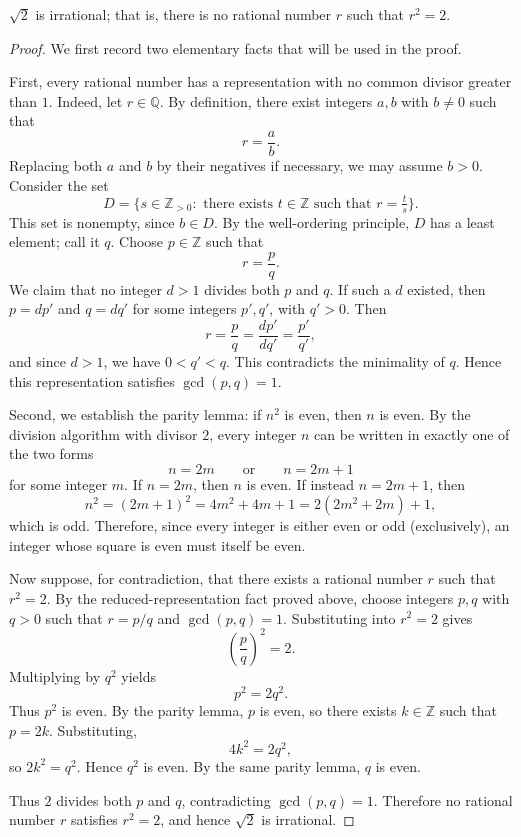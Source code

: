 \begin{theorem}
$\sqrt{2}$ is irrational; that is, there is no rational number $r$ such that $r^2=2$.
\end{theorem}

\begin{proof}
We first record two elementary facts that will be used in the proof.

First, every rational number has a representation with no common divisor greater than $1$. Indeed, let $r\in\mathbb{Q}$. By definition, there exist integers $a,b$ with $b\neq 0$ such that
\[
r=\frac{a}{b}.
\]
Replacing both $a$ and $b$ by their negatives if necessary, we may assume $b>0$. Consider the set
\[
D=\bigl\{s\in\mathbb{Z}_{>0}:\text{ there exists }t\in\mathbb{Z}\text{ such that }r=\tfrac{t}{s}\bigr\}.
\]
This set is nonempty, since $b\in D$. By the well-ordering principle, $D$ has a least element; call it $q$. Choose $p\in\mathbb{Z}$ such that
\[
r=\frac{p}{q}.
\]
We claim that no integer $d>1$ divides both $p$ and $q$. If such a $d$ existed, then $p=dp'$ and $q=dq'$ for some integers $p',q'$, with $q'>0$. Then
\[
r=\frac{p}{q}=\frac{dp'}{dq'}=\frac{p'}{q'},
\]
and since $d>1$, we have $0<q'<q$. This contradicts the minimality of $q$. Hence this representation satisfies $\gcd(p,q)=1$.

Second, we establish the parity lemma: if $n^2$ is even, then $n$ is even. By the division algorithm with divisor $2$, every integer $n$ can be written in exactly one of the two forms
\[
n=2m \qquad \text{or} \qquad n=2m+1
\]
for some integer $m$. If $n=2m$, then $n$ is even. If instead $n=2m+1$, then
\[
n^2=(2m+1)^2=4m^2+4m+1=2(2m^2+2m)+1,
\]
which is odd. Therefore, since every integer is either even or odd (exclusively), an integer whose square is even must itself be even.

Now suppose, for contradiction, that there exists a rational number $r$ such that $r^2=2$. By the reduced-representation fact proved above, choose integers $p,q$ with $q>0$ such that $r=p/q$ and $\gcd(p,q)=1$. Substituting into $r^2=2$ gives
\[
\left(\frac{p}{q}\right)^2=2.
\]
Multiplying by $q^2$ yields
\[
p^2=2q^2.
\]
Thus $p^2$ is even. By the parity lemma, $p$ is even, so there exists $k\in\mathbb{Z}$ such that $p=2k$. Substituting,
\[
4k^2=2q^2,
\]
so $2k^2=q^2$. Hence $q^2$ is even. By the same parity lemma, $q$ is even.

Thus $2$ divides both $p$ and $q$, contradicting $\gcd(p,q)=1$. Therefore no rational number $r$ satisfies $r^2=2$, and hence $\sqrt{2}$ is irrational.
\end{proof}
